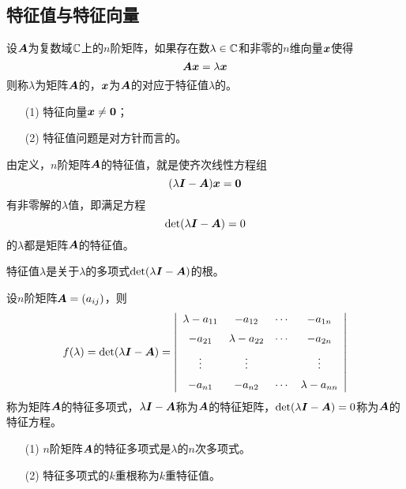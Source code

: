 \subsection{特征值与特征向量}
\begin{frame}  
    \begin{dingyi}[特征值与特征向量]
      设$\boldsymbol{A}$为复数域$\mathbb C$上的$n$阶矩阵，如果存在数$\lambda\in\mathbb C$和非零的$n$维向量${\boldsymbol{x}}$使得
      $$
      \boldsymbol{A}{\boldsymbol{x}}=\lambda{\boldsymbol{x}}
      $$
      则称$\lambda$为矩阵$\boldsymbol{A}$的，${\boldsymbol{x}}$为$\boldsymbol{A}$的对应于特征值$\lambda$的。
    \end{dingyi} \pause

    \begin{itemize}
    \item[(1)] 特征向量$\vx\ne\M0$；
    \item[(2)] 特征值问题是对方针而言的。 
    \end{itemize}
\end{frame}


\begin{frame}
  
    由定义，$n$阶矩阵$\boldsymbol{A}$的特征值，就是使齐次线性方程组
    $$
    (\lambda\MI-\MA)\vx=\M0
    $$
    有非零解的$\lambda$值，即满足方程
    $$
    \mathrm{det}(\lambda\boldsymbol{I}-\boldsymbol{A})=0
    $$
    的$\lambda$都是矩阵$\boldsymbol{A}$的特征值。
    \pause

    \begin{jielun}
      特征值$\lambda$是关于$\lambda$的多项式$\mathrm{det}(\lambda\boldsymbol{I}-\boldsymbol{A})$的根。
    \end{jielun}
    
  
\end{frame}

\begin{frame}
  
  \begin{dingyi}
      设$n$阶矩阵$\boldsymbol{A}=(a_{ij})$，则
      $$
      f(\lambda)=\mathrm{det}(\lambda\boldsymbol{I}-\boldsymbol{A})
      =\left|
      \begin{array}{cccc}
        \lambda-a_{11}&-a_{12}&\cdots&-a_{1n}\\[0.2cm]
        -a_{21}&\lambda-a_{22}&\cdots&-a_{2n}\\[0.2cm]
        \vdots&\vdots&&\vdots\\[0.2cm]
        -a_{n1}&-a_{n2}&\cdots&\lambda-a_{nn}
      \end{array}
      \right|
      $$
      称为矩阵$\boldsymbol{A}$的特征多项式，$\lambda\boldsymbol{I}-\boldsymbol{A}$称为$\boldsymbol{A}$的特征矩阵，$\mathrm{det}(\lambda\boldsymbol{I}-\boldsymbol{A})=0$称为$\boldsymbol{A}$的特征方程。
    \end{dingyi}
    \pause
    \begin{itemize}
    \item[(1)]  $n$阶矩阵$\boldsymbol{A}$的特征多项式是$\lambda$的$n$次多项式。\pause
    \item[(2)]  特征多项式的$k$重根称为$k$重特征值。
    \end{itemize}
  
\end{frame}

